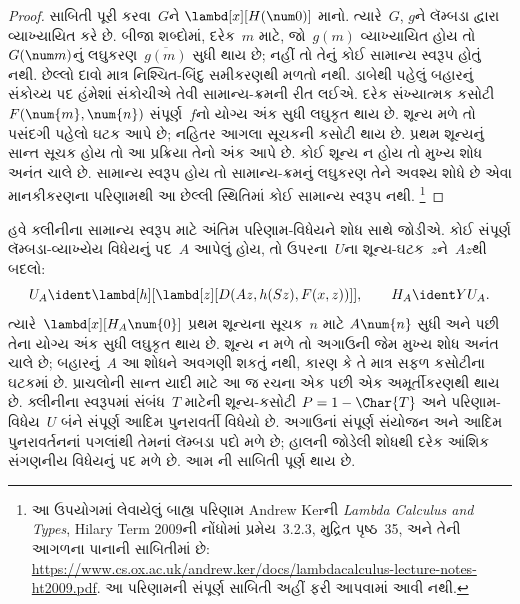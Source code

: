 \begin{proof}
સાબિતી પૂરી કરવા~$G$ને $\lambd[x][H(\num 0)]$ માનો.
ત્યારે~$G$, $g$ને લૅમ્બડા દ્વારા વ્યાખ્યાયિત કરે છે. બીજા શબ્દોમાં,
દરેક~$m$ માટે, જો~$g(m)$ વ્યાખ્યાયિત હોય તો
$G(\num m)$નું લઘુકરણ~$\overline {g(m)}$ સુધી થાય છે;
નહીં તો તેનું કોઈ સામાન્ય સ્વરૂપ હોતું નથી. છેલ્લો દાવો માત્ર
નિશ્ચિત-બિંદુ સમીકરણથી મળતો નથી. ડાબેથી પહેલું બહારનું સંકોચ્ય
પદ હંમેશાં સંકોચીએ તેવી સામાન્ય-ક્રમની રીત લઈએ. દરેક સંખ્યાત્મક
કસોટી~$F(\num{m},\num{n})$ સંપૂર્ણ~$f$નો યોગ્ય અંક સુધી
લઘુકૃત થાય છે. શૂન્ય મળે તો પસંદગી પહેલો ઘટક આપે છે; નહિતર
આગલા સૂચકની કસોટી થાય છે. પ્રથમ શૂન્યનું સાન્ત સૂચક હોય તો આ
પ્રક્રિયા તેનો અંક આપે છે. કોઈ શૂન્ય ન હોય તો મુખ્ય શોધ અનંત
ચાલે છે. સામાન્ય સ્વરૂપ હોય તો સામાન્ય-ક્રમનું લઘુકરણ તેને
અવશ્ય શોધે છે એવા માનકીકરણના પરિણામથી આ છેલ્લી સ્થિતિમાં
કોઈ સામાન્ય સ્વરૂપ નથી.
\footnote{આ ઉપયોગમાં લેવાયેલું બાહ્ય પરિણામ Andrew Kerની
\emph{Lambda Calculus and Types}, Hilary Term 2009ની નોંધોમાં
પ્રમેય~3.2.3, મુદ્રિત પૃષ્ઠ~35, અને તેની આગળના પાનાની સાબિતીમાં છે:
\url{https://www.cs.ox.ac.uk/andrew.ker/docs/lambdacalculus-lecture-notes-ht2009.pdf}.
આ પરિણામની સંપૂર્ણ સાબિતી અહીં ફરી આપવામાં આવી નથી.}
\end{proof}


હવે ક્લીનીના સામાન્ય સ્વરૂપ માટે અંતિમ પરિણામ-વિધેયને શોધ સાથે
જોડીએ. કોઈ સંપૂર્ણ લૅમ્બડા-વ્યાખ્યેય વિધેયનું પદ~$A$ આપેલું હોય,
તો ઉપરના~$U$ના શૂન્ય-ઘટક~$z$ને~$Az$થી બદલો:
\[
U_A\ident\lambd[h][\lambd[z][D(Az,h(Sz),F(x,z))]],
\qquad H_A\ident YU_A.
\]
ત્યારે~$\lambd[x][H_A\num{0}]$ પ્રથમ શૂન્યના સૂચક~$n$ માટે
$A\num{n}$ સુધી અને પછી તેના યોગ્ય અંક સુધી લઘુકૃત થાય છે.
શૂન્ય ન મળે તો અગાઉની જેમ મુખ્ય શોધ અનંત ચાલે છે; બહારનું~$A$
આ શોધને અવગણી શકતું નથી, કારણ કે તે માત્ર સફળ કસોટીના ઘટકમાં છે.
પ્રાચલોની સાન્ત યાદી માટે આ જ રચના એક પછી એક અમૂર્તીકરણથી થાય છે.
ક્લીનીના સ્વરૂપમાં સંબંધ~$T$ માટેની શૂન્ય-કસોટી
$P=1-\Char{T}$ અને પરિણામ-વિધેય~$U$ બંને સંપૂર્ણ
આદિમ પુનરાવર્તી વિધેયો છે. અગાઉનાં સંપૂર્ણ સંયોજન અને આદિમ પુનરાવર્તનનાં
પગલાંથી તેમનાં લૅમ્બડા પદો મળે છે; હાલની જોડેલી શોધથી દરેક
આંશિક સંગણનીય વિધેયનું પદ મળે છે. આમ
ની સાબિતી પૂર્ણ થાય છે.

